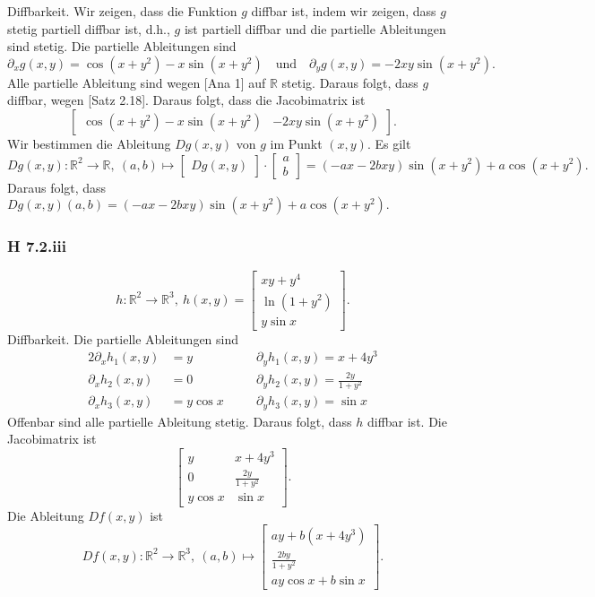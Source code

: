 \documentclass[draft,a5paper]{article}
\theoremstyle{remark}
\begin{document}
Diffbarkeit.  Wir zeigen, dass die Funktion \(g\) diffbar ist, indem
wir zeigen, dass \(g\) stetig partiell diffbar ist, d.h., \(g\) ist
partiell diffbar und die partielle Ableitungen sind stetig.  Die
partielle Ableitungen sind
\[
  \partial_{x}g(x, y) = \cos(x+y^{2}) - x \sin(x+y^{2}) \quad \text{und} \quad \partial_{y}g(x, y) = -2
  xy \sin(x+y^{2}).
\]
Alle partielle Ableitung sind wegen [Ana 1] auf \(\mathbb{R}\) stetig.  Daraus
folgt, dass \(g\) diffbar, wegen [Satz 2.18].
Daraus folgt, dass die Jacobimatrix ist
\[
  \begin{bmatrix}
    \cos(x+y^{2}) - x \sin(x+y^{2})
    & -2 xy \sin(x+y^{2})
  \end{bmatrix}.
\]
Wir bestimmen die Ableitung \(Dg(x, y)\) von \(g\) im Punkt
\((x, y)\).  Es gilt
\[ Dg(x, y)\colon \mathbb{R}^{2} \to \mathbb{R},~ (a, b) \mapsto
  \begin{bmatrix}
    Dg(x, y)
  \end{bmatrix}
  \cdot
  \begin{bmatrix}
    a \\ b
  \end{bmatrix}=
  (-ax-2bxy)\sin(x+y^{2}) + a\cos(x+y^{2}).
\]
Daraus folgt, dass
\(Dg(x, y)(a, b) = (-ax-2bxy)\sin(x+y^{2}) + a\cos(x+y^{2}).\)

\subsubsection*{H 7.2.iii}
\[
  h\colon \mathbb{R}^{2} \to \mathbb{R}^{3},~ h(x, y) =
  \begin{bmatrix}
    xy+y^{4} \\ \ln(1+y^{2}) \\ y \sin x
  \end{bmatrix}.
\]
Diffbarkeit.  Die partielle Ableitungen sind
\begin{alignat*}{2}
  \partial_{x}h_{1}(x, y) &= y &&\quad
  \partial_{y}h_{1}(x, y) = x + 4y^{3} \\
  \partial_{x}h_{2}(x, y) &= 0 &&\quad
  \partial_{y}h_{2}(x, y) = \frac{2y}{1+y^{2}} \\
  \partial_{x}h_{3}(x, y) &= y \cos x &&\quad
  \partial_{y}h_{3}(x, y) = \sin x
\end{alignat*}
Offenbar sind alle partielle Ableitung stetig.  Daraus folgt, dass
\(h\) diffbar ist.  Die Jacobimatrix ist
\[
  \begin{bmatrix}
    y & x + 4y^{3} \\
    0 & \frac{2y}{1+y^{2}} \\
    y \cos x & \sin x
  \end{bmatrix}.
\]
Die Ableitung \(Df(x,y)\) ist \[
  Df(x, y)\colon \mathbb{R}^{2} \to \mathbb{R}^{3},~ (a, b) \mapsto
  \begin{bmatrix}
    ay + b(x+4y^{3}) \\
    \frac{2by}{1+y^{2}} \\
    a y\cos x + b \sin x
  \end{bmatrix}.
\]
\end{document}
